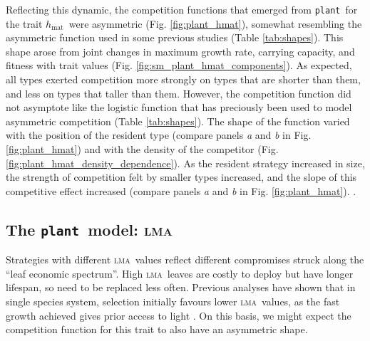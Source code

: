 \documentclass[a4paper,11pt]{article}
\newcommand{\todo}[1]{{\color{navy}{(todo: #1)}}}
\newcommand{\plant}{{\tt plant}}
\newcommand{\hmat}{\ensuremath{h_{\text{mat}}}}
\newcommand{\lma}{\textsc{lma}}
\begin{document}
Reflecting this dynamic, the competition functions that emerged from \plant\ for the trait \hmat\ were asymmetric (Fig. \ref{fig:plant_hmat}), somewhat resembling the asymmetric function used in some previous studies \citep{Law-1997, Kisdi-1999, Geritz-1999, Egas-2004, Calcagno-2006, DAndrea-2013} (Table \ref{tab:shapes}). This shape arose from joint changes in maximum growth rate, carrying capacity, and fitness with trait values (Fig. \ref{fig:sm_plant_hmat_components}). As expected, all types exerted competition more strongly on types that are shorter than them, and less on types that taller than them.  However, the competition function did not asymptote like the logistic function that has preciously been used to model asymmetric competition (Table \ref{tab:shapes}). The shape of the function varied with the position  of the resident type (compare panels \textit{a} and \textit{b} in Fig. \ref{fig:plant_hmat}) and with the density of the competitor (Fig. \ref{fig:plant_hmat_density_dependence}). As the resident strategy increased in size, the strength of competition felt by smaller types increased, and the slope of this competitive effect increased (compare panels \textit{a} and \textit{b} in Fig. \ref{fig:plant_hmat}).  \todo{expand on changes with density}.

\subsection{The \plant\ model: \lma}

Strategies with different \lma\ values reflect different compromises struck along the ``leaf economic spectrum''\citep{Reich-1997,Wright-2004}. High \lma\ leaves are costly to deploy but have longer lifespan, so need to be replaced less often. Previous analyses have shown that in single species system, selection initially favours lower \lma\ values, as the fast growth achieved gives prior access to light \citep{Falster-2017}. On this basis, we might expect the competition function for this trait to also have an asymmetric shape.
\end{document}
